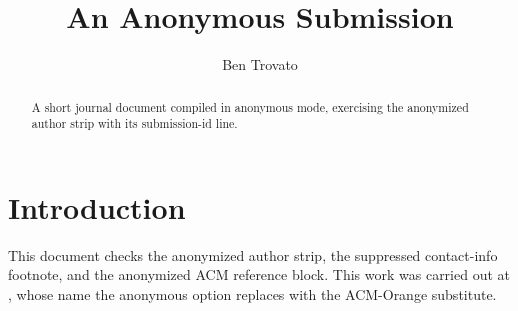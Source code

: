 \documentclass[acmsmall,anonymous]{acmart}
\begin{document}
\title{An Anonymous Submission}

\author{Ben Trovato}
\correspondingauthor
{}

\begin{abstract}
  A short journal document compiled in anonymous mode, exercising the anonymized
  author strip with its submission-id line.
\end{abstract}


\maketitle

\section{Introduction}
This document checks the anonymized author strip, the suppressed contact-info
footnote, and the anonymized ACM reference block. This work was carried out at
, whose name the anonymous
option replaces with the ACM-Orange substitute.
\end{document}
